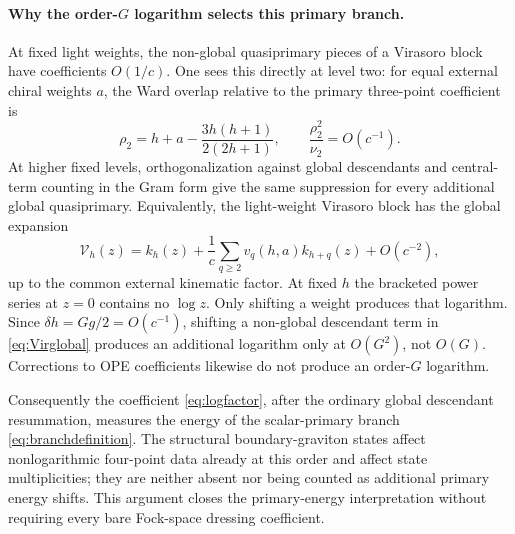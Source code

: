 \documentclass[11pt,a4paper]{article}
\numberwithin{equation}{section}
\theoremstyle{remark}\newtheorem{remark}[theorem]{Remark}
\begin{document}
\paragraph{Why the order-$G$ logarithm selects this primary branch.}
At fixed light weights, the non-global quasiprimary pieces of a Virasoro block have coefficients $O(1/c)$. One sees this directly at level two: for equal external chiral weights $a$, the Ward overlap relative to the primary three-point coefficient is
\begin{equation}
 \rho_2=h+a-\frac{3h(h+1)}{2(2h+1)},\qquad
 \frac{\rho_2^2}{\nu_2}=O(c^{-1}).
 \label{eq:rho2}
\end{equation}
At higher fixed levels, orthogonalization against global descendants and central-term counting in the Gram form give the same suppression for every additional global quasiprimary. Equivalently, the light-weight Virasoro block has the global expansion \cite{Perlmutter}
\begin{equation}
 \mathcal V_h(z)=k_h(z)+\frac1c\sum_{q\geq2}v_q(h,a)k_{h+q}(z)+O(c^{-2}),
 \label{eq:Virglobal}
\end{equation}
up to the common external kinematic factor. At fixed $h$ the bracketed power series at $z=0$ contains no $\log z$. Only shifting a weight produces that logarithm. Since $\delta h=Gg/2=O(c^{-1})$, shifting a non-global descendant term in \eqref{eq:Virglobal} produces an additional logarithm only at $O(G^2)$, not $O(G)$. Corrections to OPE coefficients likewise do not produce an order-$G$ logarithm.

Consequently the coefficient \eqref{eq:logfactor}, after the ordinary global descendant resummation, measures the energy of the scalar-primary branch \eqref{eq:branchdefinition}. The structural boundary-graviton states affect nonlogarithmic four-point data already at this order and affect state multiplicities; they are neither absent nor being counted as additional primary energy shifts. This argument closes the primary-energy interpretation without requiring every bare Fock-space dressing coefficient.
\end{document}

